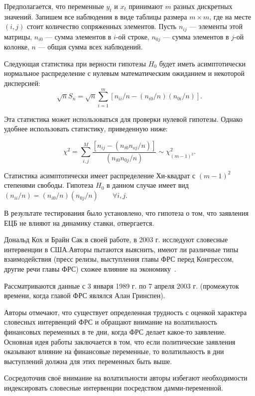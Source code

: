 \documentclass[14pt,a4paper, oneside]{extreport}
\theoremstyle{plain}              %
\theoremstyle{definition}         %
\begin{document}
Предполагается, что  переменные $y_t$ и $x_t$ принимают $m$  разных дискретных значений. Запишем все наблюдения в виде таблицы размера $m \times m$, где на месте $(i,j)$ стоит количество сопряженных элементов. Пусть $n_{ij}$ --- элементы этой матрицы, $n_{i0}$ ---   сумма элементов в $i$-ой строке, $n_{0j}$ --- сумма элементов в $j$-ой колонке, $n$ --- общая сумма всех наблюдений. 

Следующая статистика при верности гипотезы $H_0$ будет иметь асимптотически нормальное распределение с нулевым математическим ожиданием и некоторой дисперсией:
\begin{equation} 
\sqrt{n} S_n = \sqrt{n} \sum_{i=1}^m [n_{ii}/n-(n_{i0}/n)(n_{0i}/n)].
\end{equation}

Эта статистика может использоваться для проверки нулевой гипотезы. Однако удобнее использовать статистику, приведенную ниже:

\begin{equation}
\chi^2 = \sum_{i,j}^M \frac{[n_{ij}-(n_{i0}n_{oj}/n)]}{(n_{i0}n_{0j}/n)} \sim \chi^2_{(m-1)^2}.
\end{equation}

Статистика  асимптотически имеет распределение Хи-квадрат с $(m-1)^2$ степенями свободы. Гипотеза $H_0$ в данном случае имеет вид $(n_{ii}/n) = (n_{i0}/n)(n_{0j}/n) \qquad \forall i,j$. 

В результате тестирования было установлено, что гипотеза о том, что заявления ЕЦБ не влияют на динамику ставки, отвергается. 

Дональд Кох и Брайн Сак в своей работе, в 2003 г. исследуют словесные интервенции в США.Авторы пытаются выяснить, имеют ли различные типы взаимодействия (пресс релизы, выступления главы ФРС перед Конгрессом, другие речи главы ФРС) схожее влияние на экономику~\cite{kohn2003central}.

Рассматриваются данные с 3 января 1989 г. по 7 апреля 2003 г. (промежуток времени, когда главой ФРС являлся Алан Гринспен). 

Авторы отмечают, что существует определенная трудность с оценкой характера словесных интервенций ФРС и обращают внимание на волатильность финансовых переменных в те дни, когда ФРС делает какое-то заявление. Основная идея работы заключается в том, что если политические заявления оказывают влияние на финансовые переменные, то волатильность в дни выступлений должна для этих переменных быть выше. 

Сосредоточив своё внимание на волатильности авторы избегают необходимости индексировать словесные интервенции посредством дамми-переменной. 
\end{document}
